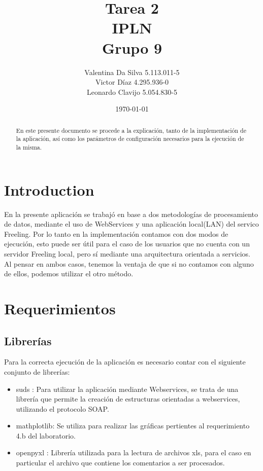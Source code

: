\documentclass[12pt]{article}
\title{Tarea 2 \\ IPLN \\ Grupo 9}
\author{
  Valentina Da Silva 5.113.011-5\\
  Victor Díaz 4.295.936-0\\
  Leonardo Clavijo 5.054.830-5
}
\date{\today}
\begin{document}
\maketitle

\begin{abstract}
En este presente documento se procede a la explicación, tanto de la implementación de la aplicación, así como los parámetros de configuración necesarios para la ejecución de la misma.
\end{abstract}

\newpage
\tableofcontents
\newpage

\section{Introduction}
En la presente aplicación se trabajó en base a dos metodologías de procesamiento de datos, mediante el uso de WebServices y una aplicación local(LAN) del servico Freeling.
Por lo tanto en la implementación contamos con dos modos de ejecución, esto puede ser útil para el caso de los usuarios que no cuenta con un servidor Freeling local, pero sí mediante una arquitectura orientada a servicios.
Al pensar en ambos casos, tenemos la ventaja de que si no contamos con alguno de ellos, podemos utilizar el otro método.

\section{Requerimientos}

\subsection{Librerías}\label{lib}
Para la correcta ejecución de la aplicación es necesario contar con el siguiente conjunto de librerías:
\begin{itemize}
  \item suds :  Para utilizar la aplicación mediante Webservices, se trata de una librería que permite la creación de estructuras orientadas a webservices, utilizando el protocolo SOAP.
  \item mathplotlib: Se utiliza para realizar las gráficas pertientes al requerimiento 4.b del laboratorio.
  \item openpyxl : Librería utilizada para la lectura de archivos xls, para el caso en particular el archivo que contiene los comentarios a ser procesados.
\end{itemize}
\end{document}
